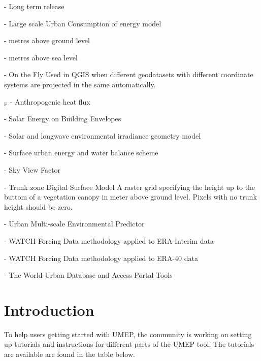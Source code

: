 \documentclass[letterpaper,10pt,english]{sphinxmanual}
\begin{document}
  - Long term release

 - Large scale Urban Consumption of energy model

 - metres above ground level

 - metres above sea level

 - On the Fly
Used in QGIS when different geodatasets with different coordinate systems are projected in the same automatically.

$_{\text{F}}$ - Anthropogenic heat flux

 - Solar Energy on Building Envelopes

 - Solar and longwave environmental irradiance geometry model

 - Surface urban energy and water balance scheme

 - Sky View Factor

 - Trunk zone Digital Surface Model
A raster grid specifying the height up to the buttom of a vegetation canopy in meter above ground level. Pixels with no trunk height should be zero.

 - Urban Multi-scale Environmental Predictor

 - WATCH Forcing Data methodology applied to ERA-Interim data

 - WATCH Forcing Data methodology applied to ERA-40 data

 - The World Urban Database and Access Portal Tools


\chapter{Introduction}
\label{\detokenize{Tutorials/Tutorials:introduction}}\label{\detokenize{Tutorials/Tutorials:tutorials}}\label{\detokenize{Tutorials/Tutorials::doc}}
To help users getting started with UMEP, the community is working on
setting up tutorials and instructions for different parts of the UMEP
tool. The tutorials are available are found in the table below.
\end{document}
